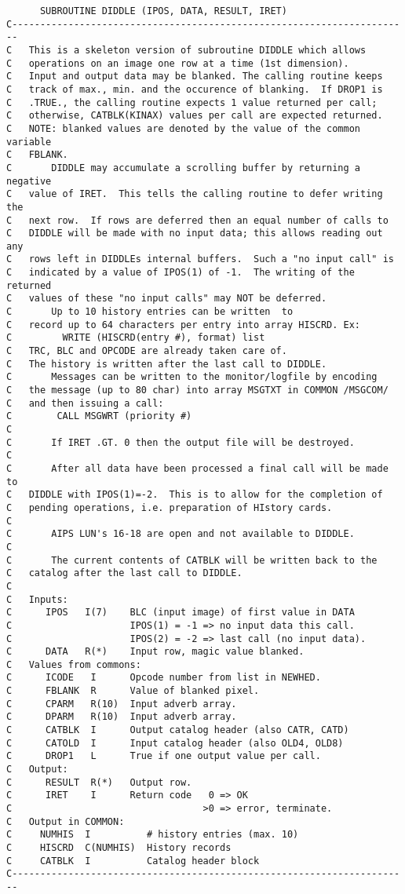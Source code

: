 \begin{verbatim}
      SUBROUTINE DIDDLE (IPOS, DATA, RESULT, IRET)
C-----------------------------------------------------------------------
C   This is a skeleton version of subroutine DIDDLE which allows
C   operations on an image one row at a time (1st dimension).
C   Input and output data may be blanked. The calling routine keeps
C   track of max., min. and the occurence of blanking.  If DROP1 is
C   .TRUE., the calling routine expects 1 value returned per call;
C   otherwise, CATBLK(KINAX) values per call are expected returned.
C   NOTE: blanked values are denoted by the value of the common variable
C   FBLANK.
C       DIDDLE may accumulate a scrolling buffer by returning a negative
C   value of IRET.  This tells the calling routine to defer writing the
C   next row.  If rows are deferred then an equal number of calls to
C   DIDDLE will be made with no input data; this allows reading out any
C   rows left in DIDDLEs internal buffers.  Such a "no input call" is
C   indicated by a value of IPOS(1) of -1.  The writing of the returned
C   values of these "no input calls" may NOT be deferred.
C       Up to 10 history entries can be written  to
C   record up to 64 characters per entry into array HISCRD. Ex:
C         WRITE (HISCRD(entry #), format) list
C   TRC, BLC and OPCODE are already taken care of.
C   The history is written after the last call to DIDDLE.
C       Messages can be written to the monitor/logfile by encoding
C   the message (up to 80 char) into array MSGTXT in COMMON /MSGCOM/
C   and then issuing a call:
C        CALL MSGWRT (priority #)
C
C       If IRET .GT. 0 then the output file will be destroyed.
C
C       After all data have been processed a final call will be made to
C   DIDDLE with IPOS(1)=-2.  This is to allow for the completion of
C   pending operations, i.e. preparation of HIstory cards.
C
C       AIPS LUN's 16-18 are open and not available to DIDDLE.
C
C       The current contents of CATBLK will be written back to the
C   catalog after the last call to DIDDLE.
C
C   Inputs:
C      IPOS   I(7)    BLC (input image) of first value in DATA
C                     IPOS(1) = -1 => no input data this call.
C                     IPOS(2) = -2 => last call (no input data).
C      DATA   R(*)    Input row, magic value blanked.
C   Values from commons:
C      ICODE   I      Opcode number from list in NEWHED.
C      FBLANK  R      Value of blanked pixel.
C      CPARM   R(10)  Input adverb array.
C      DPARM   R(10)  Input adverb array.
C      CATBLK  I      Output catalog header (also CATR, CATD)
C      CATOLD  I      Input catalog header (also OLD4, OLD8)
C      DROP1   L      True if one output value per call.
C   Output:
C      RESULT  R(*)   Output row.
C      IRET    I      Return code   0 => OK
C                                  >0 => error, terminate.
C   Output in COMMON:
C     NUMHIS  I          # history entries (max. 10)
C     HISCRD  C(NUMHIS)  History records
C     CATBLK  I          Catalog header block
C-----------------------------------------------------------------------


\end{verbatim}

